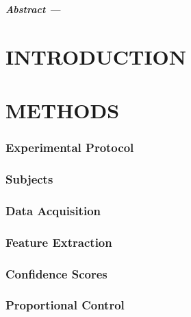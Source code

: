 \begin{multicols}{2}
	
	
	\textbf{\textit{Abstract ---} }
	
	
	\section*{INTRODUCTION}%
	
	
	
	
	\section*{METHODS}%
	
	\subsubsection*{Experimental Protocol}
	
	
	\subsubsection*{Subjects}
	
	
	\subsubsection*{Data Acquisition}
	 
	
	\subsubsection*{Feature Extraction}
	
	
	\subsubsection*{Confidence Scores}
	
	
	\subsubsection*{Proportional Control}
	
	

\end{multicols}
